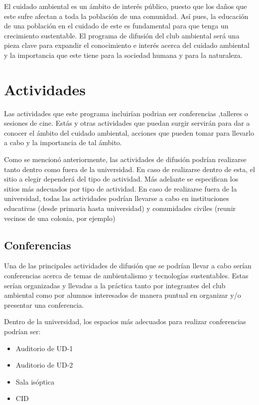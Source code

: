 

El cuidado ambiental es un ámbito de interés público, puesto que los daños que este sufre afectan a toda la población de una comunidad. Así pues, la educación de una población en el cuidado de este es fundamental para que tenga un crecimiento sustentable. El programa de difusión del club ambiental será una pieza clave para expandir el conocimiento e interés acerca del cuidado ambiental y la importancia que este tiene para la sociedad humana y para la naturaleza.

\section{Actividades}

Las actividades que este programa incluirían podrian ser conferencias ,talleres o sesiones de cine. Estás y otras actividades que puedan surgir servirán para dar a conocer el ámbito del cuidado ambiental, acciones que pueden tomar para llevarlo a cabo y la importancia de tal ámbito.

Como se mencionó anteriormente, las actividades de difusión podrían realizarse tanto dentro como fuera de la universidad. En caso de realizarse dentro de esta, el sitio a elegir dependerá del tipo de actividad. Más adelante se especifican los sitios más adecuados por tipo de actividad. En caso de realizarse fuera de la universidad, todas las actividades podrían llevarse a cabo en instituciones educativas (desde primaria hasta universidad) y comunidades civiles (reunir vecinos de una colonia, por ejemplo)

\subsection{Conferencias}

Una de las principales actividades de difusión que se podrían llevar a cabo serían conferencias acerca de temas de ambientalismo y tecnologías sustentables. Estas serían organizadas y llevadas a la práctica tanto por integrantes del club ambiental como por alumnos interesados de manera puntual en organizar y/o presentar una conferencia.

Dentro de la universidad, los espacios más adecuados para realizar conferencias podrían ser:

\begin{itemize}
    \item Auditorio de UD-1
    \item Auditorio de UD-2
    \item Sala isóptica
    \item CID
\end{itemize}

